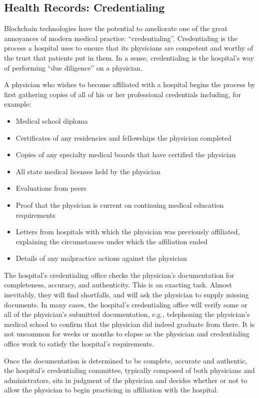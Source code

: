 \subsection{Health Records: Credentialing}

Blockchain technologies have the potential to ameliorate one of the great annoyances of modern
medical practice: ``credentialing''. Credentialing is the process a hospital uses to ensure that
its physicians are competent and worthy of the trust that patients put in them. In a sense,
credentialing is the hospital's way of performing ``due diligence'' on a physician.

A physician who wishes to become affiliated with a hospital begins the process by first gathering
copies of all of his or her professional credentials including, for example:

\begin{itemize}
\item Medical school diploma
\item Certificates of any residencies and fellowships the physician completed
\item Copies of any specialty medical boards that have certified the physician
\item All state medical licenses held by the physician
\item Evaluations from peers
\item Proof that the physician is current on continuing medical education requirements
\item Letters from hospitals with which the physician was previously affiliated, explaining the
  circumstances under which the affiliation ended 
\item Details of any malpractice actions against the physician
\end{itemize}

The hospital's credentialing office checks the physician's documentation for completeness, accuracy,
and authenticity. This is an exacting task.  Almost inevitably, they will find shortfalls, and will
ask the physician to supply missing documents. In many cases, the hospital's credentialing office
will verify some or all of the physician's submitted documentation, e.g., telephoning the
physician's medical school to confirm that the physician did indeed graduate from there.  It is not
uncommon for weeks or months to elapse as the physician and credentialing office work to satisfy the
hospital's requirements.

Once the documentation is determined to be complete, accurate and authentic, the hospital's
credentialing committee, typically composed of both physicians and administrators, sits in judgment
of the physician and decides whether or not to allow the physician to begin practicing in
affiliation with the hospital.

